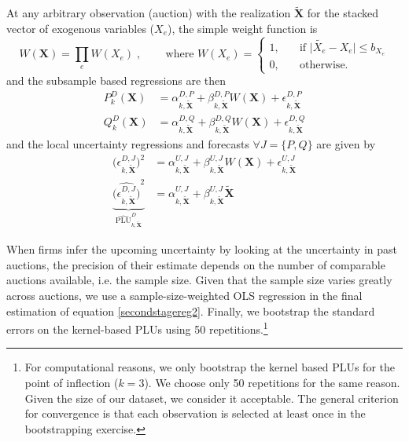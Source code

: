 At any arbitrary observation (auction) with the realization $\boldsymbol{\tilde{X}}$ for the stacked vector of exogenous variables ($X_e$), the simple weight function is 
\begin{equation}
W(\boldsymbol{X}) =  \prod_{e} W(X_e) \; \text{,} \quad  \quad  \text{ where  } 
W(X_e) = \begin{cases} 1, \quad & \mbox{if } \vert \tilde{X_e} - X_e \vert \leq b_{X_e} 
\\ 
0, \quad & \mbox{otherwise. } \end{cases}
\end{equation}
and the subsample based regressions are then
\begin{align}
P^D_k(\boldsymbol{X}) &= \alpha^{D,P}_{k,\boldsymbol{\tilde{X}}} + \beta^{D,P}_{k,\boldsymbol{\tilde{X}}} W(\boldsymbol{X}) + \epsilon^{D,P}_{k,\boldsymbol{\tilde{X}}} \\
Q^D_k(\boldsymbol{X}) &= \alpha^{D,Q}_{k,\boldsymbol{\tilde{X}}} + \beta^{D,Q}_{k,\boldsymbol{\tilde{X}}} W(\boldsymbol{X}) + \epsilon^{D,Q}_{k,\boldsymbol{\tilde{X}}} 
\end{align}
and the local uncertainty regressions and forecasts $\forall J=\{P,Q\} $ are given  by
\begin{align}
\bigl(\epsilon^{D,J}_{k,\boldsymbol{\tilde{X}}}\bigr)^2 &= \alpha^{U,J}_{k,\boldsymbol{\tilde{X}}} + \beta^{U,J}_{k,\boldsymbol{\tilde{X}}} W(\boldsymbol{X})  + \epsilon^{U,J}_{k,\boldsymbol{\tilde{X}}} \\
%
\underbrace{\widehat{\bigl(\epsilon^{D,J}_{k,\boldsymbol{\tilde{X}}}\bigr)}^2}_{\widehat{\text{PLU}}^D_{k, \boldsymbol{\tilde{X}}}} &= \alpha^{U,J}_{k,\boldsymbol{\tilde{X}}} + \beta^{U,J}_{k,\boldsymbol{\tilde{X}}} \boldsymbol{\tilde{X}}
\end{align}

When firms infer the upcoming uncertainty by looking at the uncertainty in past auctions, the precision of their estimate depends on the number of comparable auctions available, i.e. the sample size. Given that the sample size varies greatly across auctions, we use a sample-size-weighted OLS regression in the final estimation of equation \ref{secondstagereg2}. Finally, we bootstrap the standard errors on the kernel-based PLUs using 50 repetitions.\footnote{For computational reasons, we only bootstrap the kernel based PLUs for the point of inflection ($k=3$). We choose only 50 repetitions for the same reason. Given the size of our dataset, we consider it acceptable. The general criterion for convergence is that each observation is selected at least once in the bootstrapping exercise.}\\


